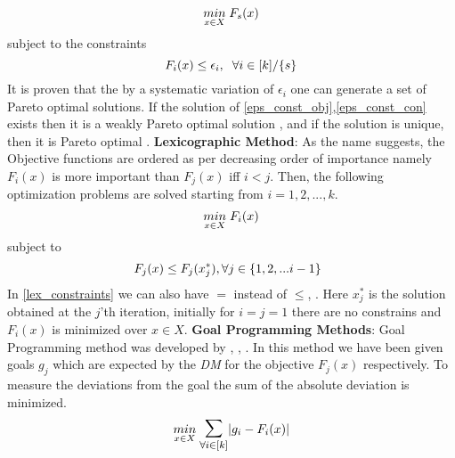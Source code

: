 \begin{equation}\label{eps_const_obj}
    \underset{x \in X}{min}\hspace{1mm} F_s(x)
\end{equation}
\newline subject to the constraints
\begin{equation}\label{eps_const_con}
    F_i(x) \le \epsilon_i,\hspace{2mm} \forall i \in [k]/\{s\}
\end{equation}\newline
It is proven that the by a systematic variation of $\epsilon_i$ one can generate a set of Pareto optimal solutions\cite{hwang1979methods}.
If the solution of \ref{eps_const_obj},\ref{eps_const_con} exists then it is a weakly Pareto optimal solution \cite{miettinen2012nonlinear}, and if the solution is unique, then it is Pareto optimal \cite{miettinen2012nonlinear}.
\newline \newline \textbf{Lexicographic Method}: As the name suggests, the Objective functions are ordered as per decreasing order of importance namely $F_i(x)$ is more important than $F_j(x)$ iff $i<j$. Then, the following optimization problems are solved starting from $i=1,2,...,k$.
\begin{equation} \label{lex_obj}
    \underset{x\in X}{min}\hspace{1mm} F_i(x)
\end{equation}
\newline subject to
\begin{equation} \label{lex_constraints}
    F_j(x) \le F_j(x^{*}_j), \forall j \in \{1,2,...i-1\}\hspace{2mm}
\end{equation}
\newline In \ref{lex_constraints} we can also have $=$ instead of $\le$, \cite{stadler1988multicriteria}. Here $x^{*}_j$ is the solution obtained at the $j$'th iteration, initially for $i=j=1$ there are no constrains and $F_i(x)$ is minimized over $x\in X$. 
\newline \newline \textbf{Goal Programming Methods}: Goal Programming method was developed by \cite{charnes1955optimal}, \cite{ijiri1965management}, \cite{charnes1967effective}. In this method we have been given goals $g_j$ which are expected by the \textit{DM} for the objective $F_j(x)$ respectively. To measure the deviations from the goal the sum of the absolute deviation is minimized. 
\begin{equation}
    \underset{x\in X}{min} \hspace{1mm}\mathlarger{\mathlarger{\sum}}_{\forall i\in [k]} |g_i - F_i(x)|
\end{equation}
